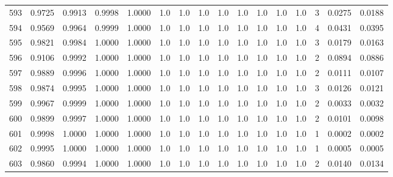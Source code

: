 \begin{tabular}{lrrrrrrrrrrrrrrr}
593 &      0.9725 &  0.9913 &  0.9998 &  1.0000 &     1.0 &     1.0 &     1.0 &     1.0 &     1.0 &     1.0 &      1.0 &        1.0 &      3 &                    0.0275 &                     0.0188 \\
594 &      0.9569 &  0.9964 &  0.9999 &  1.0000 &     1.0 &     1.0 &     1.0 &     1.0 &     1.0 &     1.0 &      1.0 &        1.0 &      4 &                    0.0431 &                     0.0395 \\
595 &      0.9821 &  0.9984 &  1.0000 &  1.0000 &     1.0 &     1.0 &     1.0 &     1.0 &     1.0 &     1.0 &      1.0 &        1.0 &      3 &                    0.0179 &                     0.0163 \\
596 &      0.9106 &  0.9992 &  1.0000 &  1.0000 &     1.0 &     1.0 &     1.0 &     1.0 &     1.0 &     1.0 &      1.0 &        1.0 &      2 &                    0.0894 &                     0.0886 \\
597 &      0.9889 &  0.9996 &  1.0000 &  1.0000 &     1.0 &     1.0 &     1.0 &     1.0 &     1.0 &     1.0 &      1.0 &        1.0 &      2 &                    0.0111 &                     0.0107 \\
598 &      0.9874 &  0.9995 &  1.0000 &  1.0000 &     1.0 &     1.0 &     1.0 &     1.0 &     1.0 &     1.0 &      1.0 &        1.0 &      3 &                    0.0126 &                     0.0121 \\
599 &      0.9967 &  0.9999 &  1.0000 &  1.0000 &     1.0 &     1.0 &     1.0 &     1.0 &     1.0 &     1.0 &      1.0 &        1.0 &      2 &                    0.0033 &                     0.0032 \\
600 &      0.9899 &  0.9997 &  1.0000 &  1.0000 &     1.0 &     1.0 &     1.0 &     1.0 &     1.0 &     1.0 &      1.0 &        1.0 &      2 &                    0.0101 &                     0.0098 \\
601 &      0.9998 &  1.0000 &  1.0000 &  1.0000 &     1.0 &     1.0 &     1.0 &     1.0 &     1.0 &     1.0 &      1.0 &        1.0 &      1 &                    0.0002 &                     0.0002 \\
602 &      0.9995 &  1.0000 &  1.0000 &  1.0000 &     1.0 &     1.0 &     1.0 &     1.0 &     1.0 &     1.0 &      1.0 &        1.0 &      1 &                    0.0005 &                     0.0005 \\
603 &      0.9860 &  0.9994 &  1.0000 &  1.0000 &     1.0 &     1.0 &     1.0 &     1.0 &     1.0 &     1.0 &      1.0 &        1.0 &      2 &                    0.0140 &                     0.0134 \\

\end{tabular}
